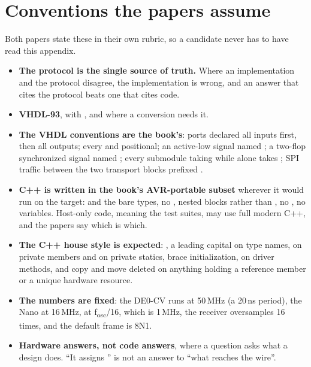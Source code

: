 \section*{Conventions the papers assume}
Both papers state these in their own rubric, so a candidate never has to have read this appendix.
\begin{itemize}
  \item \textbf{The protocol is the single source of truth.} Where an implementation and the
    protocol disagree, the implementation is wrong, and an answer that cites the protocol beats one
    that cites code.
  \item \textbf{VHDL-93}, with , and  where a
    conversion needs it.
  \item \textbf{The VHDL conventions are the book's}: ports declared all inputs first, then all
    outputs; every  and  positional; an active-low signal named
    ; a two-flop synchronized signal named ; every submodule taking
     while  alone takes ; SPI traffic between the two
    transport blocks prefixed .
  \item \textbf{C++ is written in the book's AVR-portable subset} wherever it would run on the
    target:  and the bare types, no , nested  blocks
    rather than , no \code{[[nodiscard]]}, no  variables.
    Host-only code, meaning the test suites, may use full modern C++, and the papers say which is
    which.
  \item \textbf{The C++ house style is expected}: , a leading capital on type names,
     on private members and  on private statics, brace initialization,
     on driver methods, and copy and move deleted on anything holding a reference
    member or a unique hardware resource.
  \item \textbf{The numbers are fixed}: the DE0-CV runs at 50\,MHz (a 20\,ns period), the Nano at
    16\,MHz,  at f\textsubscript{osc}/16, which is 1\,MHz, the receiver oversamples 16
    times, and the default frame is 8N1.
  \item \textbf{Hardware answers, not code answers}, where a question asks what a design does. ``It
    assigns '' is not an answer to ``what reaches the wire''.
\end{itemize}

